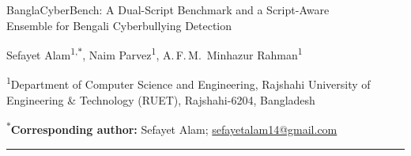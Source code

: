 \documentclass[11pt,a4paper]{article}
\def\texttt#1{#1}%
\def\bfseries{}%
\def\sffamily{}%
\newcommand{\bench}{BanglaCyberBench}
\begin{document}
\thispagestyle{firstpage}

\vspace{0.5em}
{\RaggedRight\sffamily\bfseries\Large\color{black}%
\bench{}: A Dual-Script Benchmark and a Script-Aware\\[1pt]
Ensemble for Bengali Cyberbullying Detection\par}
\vspace{0.6em}

{Sefayet Alam\textsuperscript{1,$\ast$},\quad
Naim Parvez\textsuperscript{1},\quad
A.\,F.\,M.~Minhazur Rahman\textsuperscript{1}\par}
\vspace{0.3em}

{\textsuperscript{1}Department of Computer Science and Engineering,
Rajshahi University of Engineering \& Technology (RUET), Rajshahi-6204, Bangladesh\par}
\vspace{0.2em}

{\small\textsuperscript{$\ast$}\textbf{Corresponding author:} Sefayet Alam;
\href{mailto:sefayetalam14@gmail.com}{\texttt{sefayetalam14@gmail.com}}\par}

\vspace{0.5em}
{\color{abstractrule}\rule{\linewidth}{0.4pt}}
\vspace{0.3em}
\end{document}
